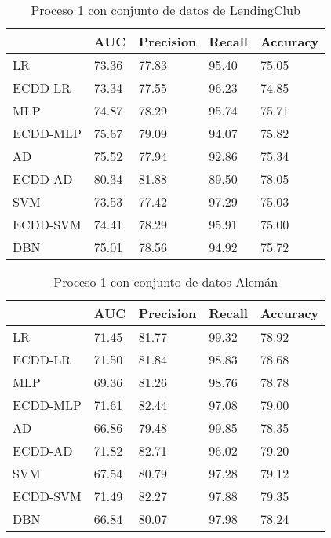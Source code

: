 \begin{table}[]
\centering
\caption{Proceso 1 con conjunto de datos de LendingClub}
\label{tab:lc-proc1}
\begin{tabularx}{0.75\textwidth}{|l|Y Y Y Y|}
                \hline
                & AUC       & Precision & Recall    & Accuracy  \\
                \hline
LR              & 73.36     & 77.83     & 95.40     & 75.05		\\
ECDD-LR           & 73.34     & 77.55     & 96.23     & 74.85		\\
                \hline
MLP             & 74.87     & 78.29     & 95.74     & 75.71		\\
ECDD-MLP          & 75.67     & 79.09     & 94.07     & 75.82		\\
                \hline
AD              & 75.52     & 77.94     & 92.86     & 75.34		\\
ECDD-AD           & 80.34     & 81.88     & 89.50     & 78.05		\\
                \hline
SVM             & 73.53     & 77.42     & 97.29     & 75.03		\\
ECDD-SVM          & 74.41     & 78.29     & 95.91     & 75.00		\\
                \hline
DBN             & 75.01     & 78.56     & 94.92     & 75.72		\\
                \hline
\end{tabularx}
\end{table}


\begin{table}[]
\centering
\caption{Proceso 1 con conjunto de datos Alemán}
\label{tab:german-proc1}
\begin{tabularx}{0.75\textwidth}{|l|Y Y Y Y|}
                \hline
                & AUC       & Precision & Recall    & Accuracy  \\
                \hline
LR              & 71.45     & 81.77     & 99.32     & 78.92     \\
ECDD-LR           & 71.50     & 81.84     & 98.83     & 78.68     \\
                \hline
MLP             & 69.36     & 81.26     & 98.76     & 78.78     \\
ECDD-MLP          & 71.61     & 82.44     & 97.08     & 79.00     \\
                \hline
AD              & 66.86     & 79.48     & 99.85     & 78.35     \\
ECDD-AD           & 71.82     & 82.71     & 96.02     & 79.20     \\
                \hline
SVM             & 67.54     & 80.79     & 97.28     & 79.12     \\
ECDD-SVM          & 71.49     & 82.27     & 97.88     & 79.35     \\
                \hline
DBN             & 66.84     & 80.07     & 97.98     & 78.24     \\
                \hline
\end{tabularx}
\end{table}


